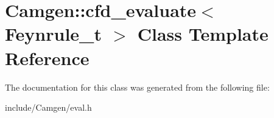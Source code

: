 \hypertarget{a00038}{}\section{Camgen\+:\+:cfd\+\_\+evaluate$<$ Feynrule\+\_\+t $>$ Class Template Reference}
\label{a00038}


The documentation for this class was generated from the following file\+:\begin{DoxyCompactItemize}
\item 
include/\+Camgen/eval.\+h\end{DoxyCompactItemize}
